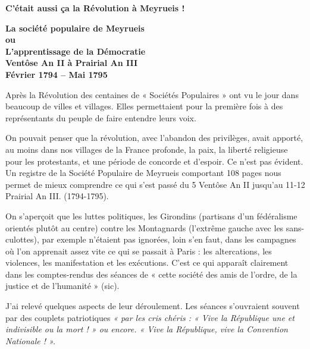 

{\fontsize{10.15}{11.9}\selectfont


\begin{center}
{\Large\bfseries C’était aussi ça la Révolution à Meyrueis !}

\vspace{0.65em}

{\bfseries
La société populaire de Meyrueis\\
ou\\
L’apprentissage de la Démocratie\\
Ventôse An II à Prairial An III\\
Février 1794 -- Mai 1795
}
\end{center}

\vspace{0.45em}

Après la Révolution des centaines de « Sociétés Populaires » ont vu le jour dans beaucoup de villes et villages. Elles permettaient pour la première fois à des représentants du peuple de faire entendre leurs voix.



On pouvait penser que la révolution, avec l’abandon des privilèges, avait apporté, au moins dans nos villages de la France profonde, la paix, la liberté religieuse pour les protestants, et une période de concorde et d’espoir. Ce n’est pas évident.
Un registre de la Société Populaire de Meyrueis comportant 108 pages nous permet de mieux comprendre ce qui s’est passé du 5 Ventôse An II jusqu’au 11-12 Prairial An III. (1794-1795).

On s’aperçoit que les luttes politiques, les Girondins (partisans d’un fédéralisme orientés plutôt au centre) contre les Montagnards (l’extrême gauche avec les sans-culottes), par exemple n’étaient pas ignorées, loin s’en faut, dans les campagnes où l’on apprenait assez vite ce qui se passait à Paris : les altercations, les violences, les manifestation et les exécutions.
C’est ce qui apparaît clairement dans les comptes-rendus des séances de « cette société des amis de l’ordre, de la justice et de l’humanité » (sic).

J’ai relevé quelques aspects de leur déroulement. Les séances s’ouvraient souvent par des couplets patriotiques \textit{« par les cris chéris : « Vive la République une et indivisible ou la mort ! » ou encore. « Vive la République, vive la Convention Nationale ! ».}

}
